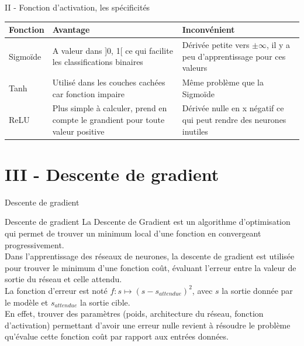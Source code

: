 \documentclass[10pt]{beamer}
\begin{document}
\begin{frame}{II - Fonction d'activation, les spécificités}


\begin{block}{}
\centering
\begin{tabular}{ |p{}||p{}|p{} | }
\hline 
   Fonction & Avantage & Inconvénient \\ [20pt] \hline \hline 
   Sigmoïde & A valeur dans ]0, 1[ ce qui facilite les classifications binaires & Dérivée petite vers $\pm\infty$, il y a peu d'apprentissage pour ces valeurs \\ [20pt] \hline
   Tanh & Utilisé dans les couches cachées car fonction impaire  & Même problème que la Sigmoïde \\ [20pt] \hline
   ReLU & Plus simple à calculer, prend en compte le grandient pour toute valeur positive & Dérivée nulle en x négatif ce qui peut rendre des neurones inutiles \\ [20pt] \hline 
\end{tabular}
\end{block}
\end{frame}


\section{III - Descente de gradient}
\begin{frame}{Descente de gradient}
\begin{block}{Descente de gradient}
La Descente de Gradient est un algorithme d’optimisation qui permet de trouver un minimum local d'une fonction en convergeant progressivement. \\
Dans l'apprentissage des réseaux de neurones, la descente de gradient est utilisée pour trouver le minimum d'une fonction coût, évaluant l'erreur entre la valeur de sortie du réseau et celle attendu. \\
La fonction d'erreur est noté $f : s \mapsto (s - s_{attendue})^2$, avec $s$ la sortie donnée par le modèle et $s_{attendue}$ la sortie cible. \\
En effet, trouver des paramètres (poids, architecture du réseau, fonction d'activation) permettant d'avoir une erreur nulle revient à résoudre le problème qu'évalue cette fonction coût par rapport aux entrées données.
\end{block}
\end{frame}
\end{document}
